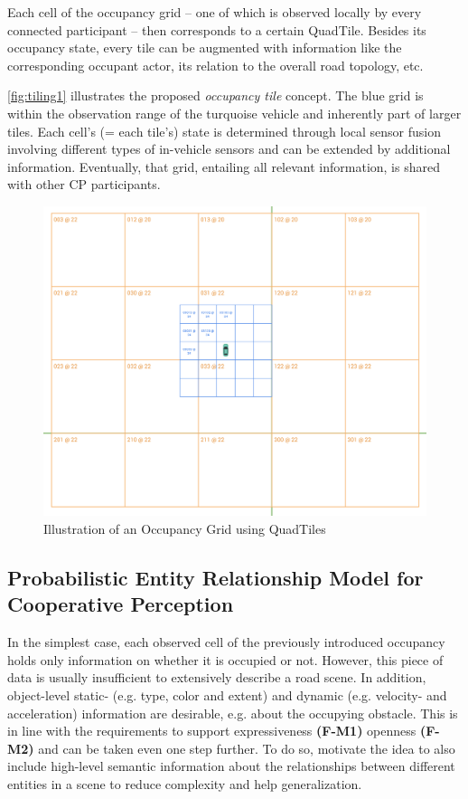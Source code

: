 Each cell of the occupancy grid – one of which is observed locally by every connected participant – then corresponds to a certain QuadTile. Besides its occupancy state, every tile can be augmented with information like the corresponding occupant actor, its relation to the overall road topology, etc. 

\autoref{fig:tiling1} illustrates the proposed \textit{occupancy tile} concept. The blue grid is within the observation range of the turquoise vehicle and inherently part of larger tiles. Each cell's (= each tile's) state is determined through local sensor fusion involving different types of in-vehicle sensors and can be extended by additional information. Eventually, that grid, entailing all relevant information, is shared with other CP participants.

\begin{figure}[h]
	\centering
	\includegraphics[width=1.0\linewidth]{98_images/geo_subscription_schema_1}
	\caption{Illustration of an Occupancy Grid using QuadTiles}
	\label{fig:tiling1}
\end{figure}


\subsection{Probabilistic Entity Relationship Model for Cooperative Perception}
\label{subsec:concept_design:probabilistic_entity_relationship_model_for_cooperative_perception}

In the simplest case, each observed cell of the previously introduced occupancy holds only information on whether it is occupied or not. However, this  piece of data is usually insufficient to extensively describe a road scene. In addition, object-level static- (e.g. type, color and extent) and dynamic (e.g. velocity- and acceleration) information are desirable, e.g. about the occupying obstacle. This is in line with the requirements to support expressiveness \textbf{(F-M1)} openness \textbf{(F-M2)} and can be taken even one step further. To do so, \cite{Kohlhaas2014, Petrich2018} motivate the idea to also include high-level semantic information about the relationships between different entities in a scene to reduce complexity and help generalization. 

